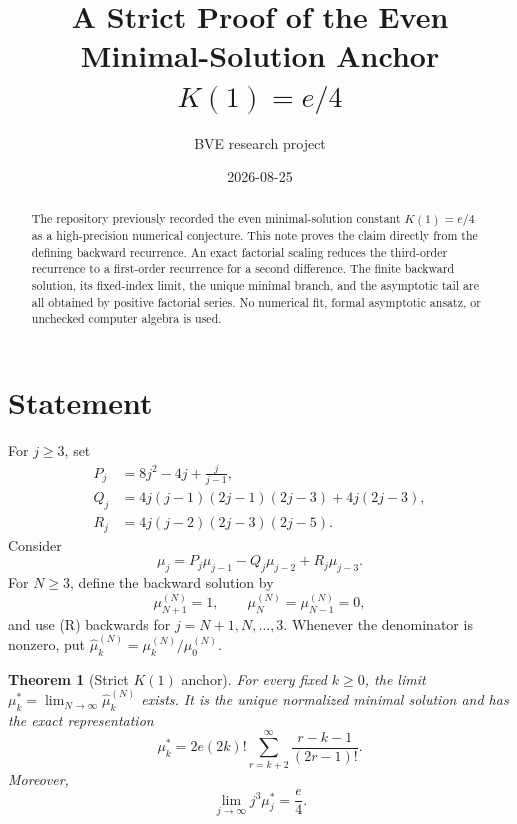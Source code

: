 \documentclass[11pt]{article}
\title{A Strict Proof of the Even Minimal-Solution Anchor $K(1)=e/4$}
\author{BVE research project}
\date{2026-08-25}
\newtheorem{theorem}{Theorem}
\begin{document}
\maketitle

\begin{abstract}
The repository previously recorded the even minimal-solution constant
\(K(1)=e/4\) as a high-precision numerical conjecture.  This note proves the
claim directly from the defining backward recurrence.  An exact factorial
scaling reduces the third-order recurrence to a first-order recurrence for a
second difference.  The finite backward solution, its fixed-index limit, the
unique minimal branch, and the asymptotic tail are all obtained by positive
factorial series.  No numerical fit, formal asymptotic ansatz, or unchecked
computer algebra is used.
\end{abstract}

\section{Statement}

For \(j\geq 3\), set
\begin{align*}
P_j&=8j^2-4j+\frac{j}{j-1},\\
Q_j&=4j(j-1)(2j-1)(2j-3)+4j(2j-3),\\
R_j&=4j(j-2)(2j-3)(2j-5).
\end{align*}
Consider
\begin{equation}
\mu_j=P_j\mu_{j-1}-Q_j\mu_{j-2}+R_j\mu_{j-3}.
\tag{R}
\end{equation}
For \(N\geq 3\), define the backward solution by
\[
\mu_{N+1}^{(N)}=1,\qquad \mu_N^{(N)}=\mu_{N-1}^{(N)}=0,
\]
and use (R) backwards for \(j=N+1,N,\ldots,3\).  Whenever the denominator is
nonzero, put \(\widehat\mu_k^{(N)}=\mu_k^{(N)}/\mu_0^{(N)}\).

\begin{theorem}[Strict \(K(1)\) anchor]
For every fixed \(k\geq 0\), the limit
\(\mu_k^*=\lim_{N\to\infty}\widehat\mu_k^{(N)}\) exists.  It is the unique
normalized minimal solution and has the exact representation
\begin{equation}
\boxed{\displaystyle
\mu_k^*=2e(2k)!\sum_{r=k+2}^{\infty}
\frac{r-k-1}{(2r-1)!}}.
\tag{1}
\end{equation}
Moreover,
\begin{equation}
\boxed{\displaystyle \lim_{j\to\infty}j^3\mu_j^*=\frac{e}{4}}.
\tag{2}
\end{equation}
\end{theorem}
\end{document}

